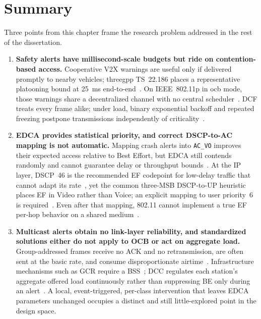 \section{Summary}
\label{sec:bg:summary}

Three points from this chapter frame the research problem addressed in the rest of the dissertation.

\begin{enumerate}
  \item \textbf{Safety alerts have millisecond-scale budgets but ride on contention-based access.}
  Cooperative V2X warnings are useful only if delivered promptly to nearby vehicles; \gls{threegpp} TS~22.186 places a representative platooning bound at \SI{25}{\milli\second} end-to-end~\cite{ts22186}.
  On IEEE~802.11p in \gls{ocb} mode, those warnings share a decentralized channel with no central scheduler~\cite{jiang2008ieee80211p,IEEE80211}.
  DCF treats every frame alike; under load, binary exponential backoff and repeated freezing postpone transmissions independently of criticality~\cite{bianchi2000DCF,Continuous_Backoff_Freezing_Li}.

  \item \textbf{EDCA provides statistical priority, and correct DSCP-to-AC mapping is not automatic.}
  Mapping crash alerts into \texttt{AC\_VO} improves their expected access relative to Best Effort, but EDCA still contends randomly and cannot guarantee delay or throughput bounds~\cite{kosekszott2012What,mangold2003QoS,RFC8325_WiFi_QoS}.
  At the IP layer, DSCP~46 is the recommended EF codepoint for low-delay traffic that cannot adapt its rate~\cite{RFC3246_EF_PHB,RFC4594_DiffServ_Service_Classes}, yet the common three-MSB DSCP-to-UP heuristic places EF in Video rather than Voice; an explicit mapping to user priority~6 is required~\cite{RFC8325_WiFi_QoS}.
  Even after that mapping, 802.11 cannot implement a true EF per-hop behavior on a shared medium~\cite{RFC8325_WiFi_QoS}.

  \item \textbf{Multicast alerts obtain no link-layer reliability, and standardized solutions either do not apply to OCB or act on aggregate load.}
  Group-addressed frames receive no ACK and no retransmission, are often sent at the basic rate, and consume disproportionate airtime~\cite{RFC9119_Multicast_IEEE802_Wireless}.
  Infrastructure mechanisms such as GCR require a BSS~\cite{kosekszott2012What}; DCC regulates each station's aggregate offered load continuously rather than suppressing BE only during an alert~\cite{etsi_dcc_2018}.
  A local, event-triggered, per-class intervention that leaves EDCA parameters unchanged occupies a distinct and still little-explored point in the design space.
\end{enumerate}

